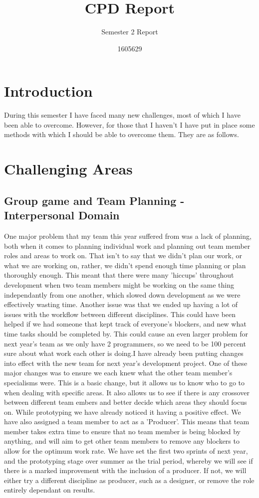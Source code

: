\documentclass{scrartcl}
\title{CPD Report}
\subtitle{Semester 2 Report}
\author{1605629}
\begin{document}
\maketitle

\section{Introduction}
During this semester I have faced many new challenges, most of which I have been able to overcome. However, for those that I haven't I have put in place some methods with which I should be able to overcome them. They are as follows.

\section{Challenging Areas}

\subsection{Group game and Team Planning - Interpersonal Domain}
One major problem that my team this year suffered from was a lack of planning, both when it comes to planning individual work and planning out team member roles and areas to work on. That isn't to say that we didn't plan our work, or what we are working on, rather, we didn't spend enough time planning or plan thoroughly enough. This meant that there were many 'hiccups' throughout development when two team members might be working on the same thing independantly from one another, which slowed down development as we were effectively wasting time. Another issue was that we ended up having a lot of issues with the workflow between different disciplines. This could have been helped if we had someone that kept track of everyone's blockers, and new what time tasks should be completed by. This could cause an even larger problem for next year's team as we only have 2 programmers, so we need to be 100 percent sure about what work each other is doing.I have already been putting changes into effect with the new team for next year's development project. One of these major changes was to ensure we each knew what the other team member's specialisms were. This is a basic change, but it allows us to know who to go to when dealing with specific areas. It also allows us to see if there is any crossover between different team embers and better decide which areas they should focus on. While prototyping we have already noticed it having a positive effect. We have also assigned a team member to act as a 'Producer'. This means that team member takes extra time to ensure that no team member is being blocked by anything, and will aim to get other team members to remove any blockers to allow for the optimum work rate. We have set the first two sprints of next year, and the prototyping stage over summer as the trial period, whereby we will see if there is a marked improvement with the inclusion of a producer. If not, we will either try a different discipline as producer, such as a designer, or remove the role entirely dependant on results.
\end{document}
